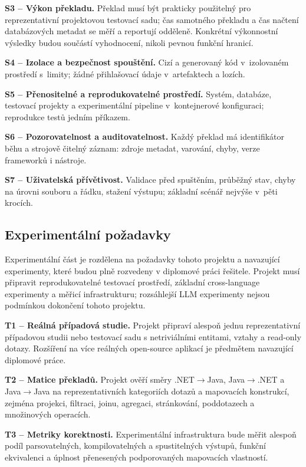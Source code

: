 \documentclass{article}
\begin{document}
\textbf{S3 -- Výkon překladu.} Překlad musí být prakticky použitelný pro reprezentativní projektovou testovací sadu; čas samotného překladu a čas načtení databázových metadat se měří a reportují odděleně. Konkrétní výkonnostní výsledky budou součástí vyhodnocení, nikoli pevnou funkční hranicí.

\textbf{S4 -- Izolace a bezpečnost spouštění.} Cizí a generovaný kód v~izolovaném prostředí s~limity; žádné přihlašovací údaje v~artefaktech a lozích. 

\textbf{S5 -- Přenositelné a reprodukovatelné prostředí.} Systém, databáze, testovací projekty a experimentální pipeline v~kontejnerové konfiguraci; reprodukce testů jedním příkazem.

\textbf{S6 -- Pozorovatelnost a auditovatelnost.} Každý překlad má identifikátor běhu a strojově čitelný záznam: zdroje metadat, varování, chyby, verze frameworků i nástroje.

\textbf{S7 -- Uživatelská přívětivost.} Validace před spuštěním, průběžný stav, chyby na úrovni souboru a řádku, stažení výstupu; základní scénář nejvýše v~pěti krocích.

\subsection{Experimentální požadavky}

Experimentální část je rozdělena na požadavky tohoto projektu a navazující experimenty, které budou plně rozvedeny v diplomové práci řešitele. Projekt musí připravit reprodukovatelné testovací prostředí, základní cross-language experimenty a měřicí infrastrukturu; rozsáhlejší LLM experimenty nejsou podmínkou dokončení tohoto projektu.

\textbf{T1 -- Reálná případová studie.} Projekt připraví alespoň jednu reprezentativní případovou studii nebo testovací sadu s netriviálními entitami, vztahy a read-only dotazy. Rozšíření na více reálných open-source aplikací je předmětem navazující diplomové práce.

\textbf{T2 -- Matice překladů.} Projekt ověří směry .NET$\to$Java, Java$\to$.NET a Java$\to$Java na reprezentativních kategoriích dotazů a mapovacích konstrukcí, zejména projekci, filtraci, joinu, agregaci, stránkování, poddotazech a množinových operacích.

\textbf{T3 -- Metriky korektnosti.} Experimentální infrastruktura bude měřit alespoň podíl parsovatelných, kompilovatelných a spustitelných výstupů, funkční ekvivalenci a úplnost přenesených podporovaných mapovacích vlastností.
\end{document}

